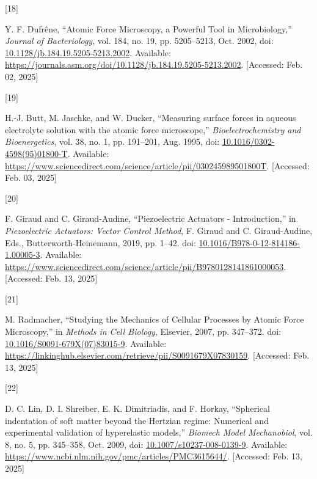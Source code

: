 \documentclass[
  paper=a4,
  ,captions=tableheading
]{scrartcl}
\newlength{\cslhangindent}
\newlength{\csllabelwidth}
\newenvironment{CSLReferences}[2] %
  {\begin{list}{}{%
   \setlength{\itemindent}{0pt}
   \setlength{\leftmargin}{0pt}
   \setlength{\parsep}{0pt}
   \ifodd #1
    \setlength{\leftmargin}{\cslhangindent}
    \setlength{\itemindent}{-1\cslhangindent}
   \fi
   \setlength{\itemsep}{#2\baselineskip}}}
  {\end{list}}
\newcommand{\CSLLeftMargin}[1]{\parbox[t]{\csllabelwidth}{\strut#1\strut}}
\newcommand{\CSLRightInline}[1]{\parbox[t]{\linewidth - \csllabelwidth}{\strut#1\strut}}
\begin{document}
\begin{CSLReferences}{0}{0}
\CSLLeftMargin{{[}18{]} }%
\CSLRightInline{Y. F. Dufrêne, {``Atomic {Force Microscopy}, a {Powerful
Tool} in {Microbiology},''} \emph{Journal of Bacteriology}, vol. 184,
no. 19, pp. 5205--5213, Oct. 2002, doi:
\href{https://doi.org/10.1128/jb.184.19.5205-5213.2002}{10.1128/jb.184.19.5205-5213.2002}.
Available:
\url{https://journals.asm.org/doi/10.1128/jb.184.19.5205-5213.2002}.
{[}Accessed: Feb. 02, 2025{]}}

\CSLLeftMargin{{[}19{]} }%
\CSLRightInline{H.-J. Butt, M. Jaschke, and W. Ducker, {``Measuring
surface forces in aqueous electrolyte solution with the atomic force
microscope,''} \emph{Bioelectrochemistry and Bioenergetics}, vol. 38,
no. 1, pp. 191--201, Aug. 1995, doi:
\href{https://doi.org/10.1016/0302-4598(95)01800-T}{10.1016/0302-4598(95)01800-T}.
Available:
\url{https://www.sciencedirect.com/science/article/pii/030245989501800T}.
{[}Accessed: Feb. 03, 2025{]}}

\CSLLeftMargin{{[}20{]} }%
\CSLRightInline{F. Giraud and C. Giraud-Audine, {``Piezoelectric
{Actuators} - {Introduction},''} in \emph{Piezoelectric {Actuators}:
{Vector Control Method}}, F. Giraud and C. Giraud-Audine, Eds.,
Butterworth-Heinemann, 2019, pp. 1--42. doi:
\href{https://doi.org/10.1016/B978-0-12-814186-1.00005-3}{10.1016/B978-0-12-814186-1.00005-3}.
Available:
\url{https://www.sciencedirect.com/science/article/pii/B9780128141861000053}.
{[}Accessed: Feb. 13, 2025{]}}

\CSLLeftMargin{{[}21{]} }%
\CSLRightInline{M. Radmacher, {``Studying the {Mechanics} of {Cellular
Processes} by {Atomic Force Microscopy},''} in \emph{Methods in {Cell
Biology}}, Elsevier, 2007, pp. 347--372. doi:
\href{https://doi.org/10.1016/S0091-679X(07)83015-9}{10.1016/S0091-679X(07)83015-9}.
Available:
\url{https://linkinghub.elsevier.com/retrieve/pii/S0091679X07830159}.
{[}Accessed: Feb. 13, 2025{]}}

\CSLLeftMargin{{[}22{]} }%
\CSLRightInline{D. C. Lin, D. I. Shreiber, E. K. Dimitriadis, and F.
Horkay, {``Spherical indentation of soft matter beyond the {Hertzian}
regime: Numerical and experimental validation of hyperelastic models,''}
\emph{Biomech Model Mechanobiol}, vol. 8, no. 5, pp. 345--358, Oct.
2009, doi:
\href{https://doi.org/10.1007/s10237-008-0139-9}{10.1007/s10237-008-0139-9}.
Available: \url{https://www.ncbi.nlm.nih.gov/pmc/articles/PMC3615644/}.
{[}Accessed: Feb. 13, 2025{]}}


\end{CSLReferences}
\end{document}
